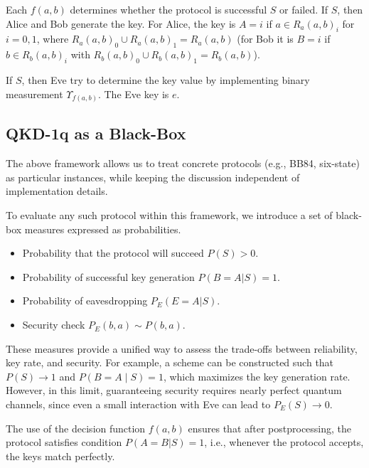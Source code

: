 \documentclass[a4paper,twocolumn,11pt,unpublished]{quantumarticle}
\begin{document}
Each $f(a,b)$ determines whether the protocol is successful $S$ or failed. If
$S$, then Alice and Bob generate the key. For Alice, the key is $A=i$ if $a \in
R_a(a,b)_i$ for $i=0,1$, where $R_a(a,b)_0 \cup R_a(a,b)_1 = R_a(a,b)$ (for Bob
it is $B=i$ if $b \in R_b(a,b)_i$ with $R_b(a,b)_0 \cup R_b(a,b)_1 = R_b(a,b)$).

If $S$, then Eve try to determine the key value by implementing binary
measurement $\Upsilon_{f(a,b)}$. The Eve key is $e$.

\subsection{QKD-1q as a Black-Box}

The above framework allows us to treat concrete protocols (e.g., BB84,
six-state) as particular instances, while keeping the discussion independent of
implementation details.

To evaluate any such protocol within this framework, we introduce a set of
black-box measures expressed as probabilities.
\begin{itemize}
    \item Probability that the protocol will succeed $P(S)>0$.
    \item Probability of successful key generation $P(B=A|S)=1$.
    \item Probability of eavesdropping $P_E(E=A|S)$.
    \item Security check $P_E(b,a) \sim P(b,a)$.
\end{itemize}
These measures provide a unified way to assess the trade-offs between
reliability, key rate, and security. For example, a scheme can be constructed
such that $P(S) \to 1$ and $P(B=A \mid S)=1$, which maximizes the key generation
rate. However, in this limit, guaranteeing security requires
nearly perfect quantum channels, since even a small interaction with Eve can
lead to $P_E(S) \to 0$.

The use of the decision function $f(a,b)$ ensures that after postprocessing, the
protocol satisfies condition $P(A=B|S)=1$, i.e., whenever the protocol accepts,
the keys match perfectly.
\end{document}
